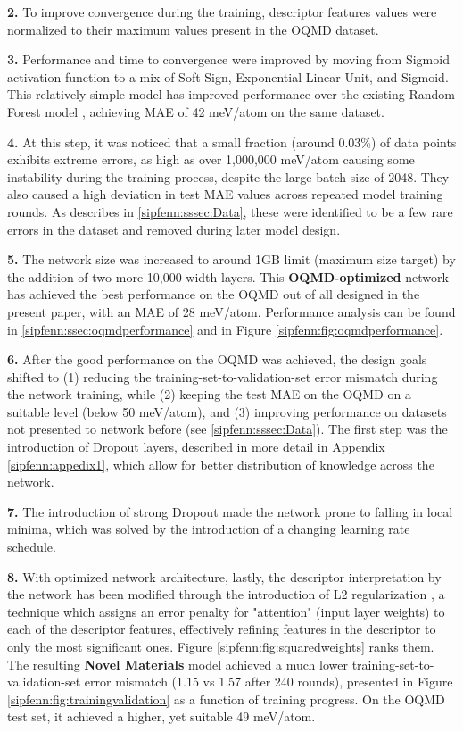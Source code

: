 \textbf{2. }To improve convergence during the training, descriptor features values were normalized to their maximum values present in the OQMD dataset.

\textbf{3. }Performance and time to convergence were improved by moving from Sigmoid activation function to a mix of Soft Sign, Exponential Linear Unit, and Sigmoid. This relatively simple model has improved performance over the existing Random Forest model \cite{Ward2017IncludingTessellations}, achieving MAE of 42 meV/atom on the same dataset.

\textbf{4. }At this step, it was noticed that a small fraction (around 0.03\%) of data points exhibits extreme errors, as high as over 1,000,000 meV/atom causing some instability during the training process, despite the large batch size of 2048. They also caused a high deviation in test MAE values across repeated model training rounds. As describes in \ref{sipfenn:sssec:Data}, these were identified to be a few rare errors in the dataset and removed during later model design. 

\textbf{5. }The network size was increased to around 1GB limit (maximum size target) by the addition of two more 10,000-width layers. This \textbf{OQMD-optimized} network has achieved the best performance on the OQMD out of all designed in the present paper, with an MAE of 28 meV/atom. Performance analysis can be found in \ref{sipfenn:ssec:oqmdperformance} and in Figure \ref{sipfenn:fig:oqmdperformance}.

\textbf{6. }After the good performance on the OQMD was achieved, the design goals shifted to (1) reducing the training-set-to-validation-set error mismatch during the network training, while (2) keeping the test MAE on the OQMD on a suitable level (below 50 meV/atom), and (3) improving performance on datasets not presented to network before (see \ref{sipfenn:sssec:Data}). The first step was the introduction of Dropout layers\cite{srivastava2014dropout}, described in more detail in Appendix \ref{sipfenn:appedix1}, which allow for better distribution of knowledge across the network.

\textbf{7. }The introduction of strong Dropout\cite{srivastava2014dropout} made the network prone to falling in local minima, which was solved by the introduction of a changing learning rate schedule.

\textbf{8. }With optimized network architecture, lastly, the descriptor interpretation by the network has been modified through the introduction of L2 regularization \cite{L2Regularization}, a technique which assigns an error penalty for "attention" (input layer weights) to each of the descriptor features, effectively refining features in the descriptor to only the most significant ones. Figure \ref{sipfenn:fig:squaredweights} ranks them. The resulting \textbf{Novel Materials} model achieved a much lower training-set-to-validation-set error mismatch (1.15 vs 1.57 after 240 rounds), presented in Figure \ref{sipfenn:fig:trainingvalidation} as a function of training progress. On the OQMD test set, it achieved a higher, yet suitable 49 meV/atom.

